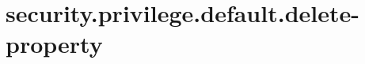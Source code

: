 \section{security.privilege.default.delete-property}
\label{configuration:SecurityPrivilegeDefaultDeleteProperty}
\AvailableInJavaOnly{\TODO}